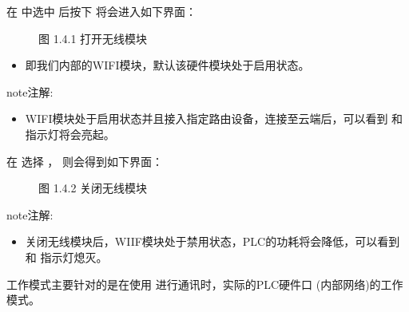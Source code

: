 \documentclass[a4paper,10pt,english]{sphinxmanual}
\begin{document}
\sphinxAtStartPar
在  中选中  后按下  将会进入如下界面：

\begin{figure}[htbp]
\centering
\capstart

\noindent{}
\caption{图 1.4.1 打开无线模块}\label{\detokenize{operation_guide:id8}}\end{figure}
\begin{itemize}
\item {} 
\sphinxAtStartPar
{} 即我们内部的WIFI模块，默认该硬件模块处于启用状态。

\end{itemize}

\begin{sphinxadmonition}{note}{注解:}\begin{itemize}
\item {} 
\sphinxAtStartPar
WIFI模块处于启用状态并且接入指定路由设备，连接至云端后，可以看到  和  指示灯将会亮起。

\end{itemize}
\end{sphinxadmonition}

\sphinxAtStartPar
在  选择 ， 则会得到如下界面：

\begin{figure}[htbp]
\centering
\capstart

\noindent{}
\caption{图 1.4.2 关闭无线模块}\label{\detokenize{operation_guide:id9}}\end{figure}

\begin{sphinxadmonition}{note}{注解:}\begin{itemize}
\item {} 
\sphinxAtStartPar
关闭无线模块后，WIIF模块处于禁用状态，PLC的功耗将会降低，可以看到  和  指示灯熄灭。

\end{itemize}
\end{sphinxadmonition}

\sphinxAtStartPar
{}

\sphinxAtStartPar
工作模式主要针对的是在使用  进行通讯时，实际的PLC硬件口  (内部网络)的工作模式。
\end{document}
